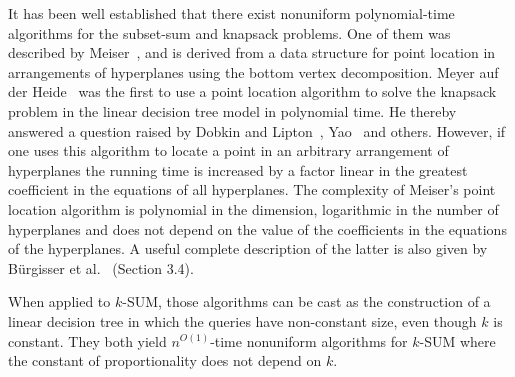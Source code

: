 It has been well established that there exist nonuniform
polynomial-time algorithms for the subset-sum and knapsack problems.
%
One of them was described by Meiser~\cite{M93}, and is derived from a data
structure for point location in arrangements of hyperplanes using the bottom
vertex decomposition.
%
Meyer auf der Heide~\cite{M84} was the first to use a point location algorithm to solve
the knapsack problem in the linear decision tree model in polynomial time. He
thereby answered a question raised by Dobkin and Lipton~\cite{DL74,DL78},
Yao~\cite{Y82} and others. However, if one uses this algorithm to locate a
point in an arbitrary arrangement of hyperplanes the running time is increased
by a factor linear in the greatest coefficient in the equations of all
hyperplanes.
%
The complexity of Meiser's point location algorithm is polynomial in the
dimension, logarithmic in the number of hyperplanes and does not depend on the
value of the coefficients in the equations of the hyperplanes. A useful
complete description of the latter is also given by Bürgisser et al.~\cite{B97}
(Section 3.4).

When applied to \(k\)-SUM, those algorithms can be cast as the construction of
a linear decision tree in which the queries have non-constant size, even though
\(k\) is constant. They both yield \(n^{O(1)}\)-time nonuniform algorithms for
\(k\)-SUM where the constant of proportionality does not depend on \(k\).

